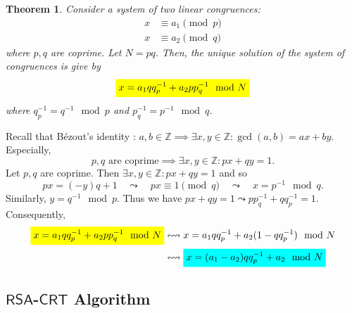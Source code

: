 \documentclass{article}
\newcommand{\mathcolorbox}[2]{\colorbox{#1}{$\displaystyle #2$}}
\newcommand{\rsa}{\mathsf{RSA}}
\newcommand{\inv}[1]{#1^{-1}}
\newtheorem*{theorem*}{Theorem}
\theoremstyle{definition}
\begin{document}
	\begin{tcolorbox}[title=Chinese Remainder Theorem (CRT) - Special Case]
		\begin{theorem*}
			Consider a system of two linear congruences:
			\begin{align*}
			x&\equiv a_1 \pmod{p}\\
			x&\equiv a_2 \pmod{q}
			\end{align*} where $p,q$ are coprime. Let $N=pq$. Then, the unique solution of the system of congruences is give by \begin{align*}
			\mathcolorbox{-blue}{x=a_1qq_p^{-1}+a_2pp_q^{-1}\mod{N}}
			\end{align*} where $q_p^{-1}=\inv{q}\mod{p}$ and $p_{q}^{-1}=\inv{p}\mod{q}$.
		\end{theorem*}
		\tcblower
		Recall that Bézout's identity : $
		a,b\in\mathbb{Z}\implies\exists x,y\in\mathbb{Z}:\gcd(a,b)=ax+by.
		$ Especially, \[
		\text{$p,q$ are coprime}\implies\exists x,y\in\mathbb{Z}: px+qy=1.
		\] Let $p,q$ are coprime. Then $\exists x,y\in\mathbb{Z}:px+qy=1$ and so \[
		px=(-y)q+1\quad\leadsto\quad px\equiv1\pmod{q}\quad\leadsto\quad x=p^{-1}\mod{q}.
		\] Similarly, $y=q^{-1}\mod{p}$. Thus we have $px+qy=1\leadsto pp_{q}^{-1}+qq_{p}^{-1}=1$. Consequently, \begin{align*}
		\mathcolorbox{-blue}{x=a_1qq_p^{-1}+a_2pp_q^{-1}\mod{N}} &\leftrightsquigarrow x=a_1qq_p^{-1}+a_2(1-qq_{p}^{-1})\mod{N}\\
		&\leftrightsquigarrow \mathcolorbox{-red}{x=(a_1-a_2)qq_p^{-1}+a_2\mod{N}}\\
		\end{align*}
	\end{tcolorbox}
	
	\newpage
	\subsection{$\rsa$-$\mathsf{CRT}$ Algorithm}
	
\end{document}
